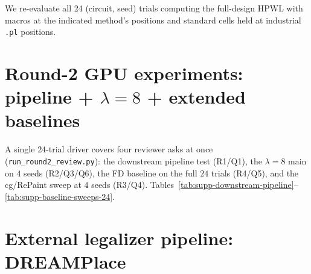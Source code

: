 \documentclass{article}
\begin{document}
We re-evaluate all 24 (circuit, seed) trials computing the full-design
HPWL with macros at the indicated method's positions and standard
cells held at industrial \texttt{.pl} positions.

\begin{table}[h]
\centering
\small

\caption{Full per-trial metrics; $\Delta\text{oa}$ is total overlap
area, $\Delta h_\text{macro}$ is macros-only HPWL,
$\Delta h_\text{full}$ is full-design HPWL with cells at \texttt{.pl}.
Median full-design $\Delta h$ is $+10.7\%$ (post-VSR) and $-1.6\%$
(VSR-intra-soft).  Adaptec3 inflates more sharply on the full design
($+73\%$ vs.\ $+18\%$ macros-only); other circuits track the
macros-only trend.}
\label{tab:supp-full-hpwl}
\end{table}

\section{Round-2 GPU experiments: pipeline + $\lambda{=}8$ + extended baselines}
\label{sec:supp-round2}

A single $24$-trial driver covers four reviewer asks at once
(\texttt{run\_round2\_review.py}):
the downstream pipeline test (R1/Q1), the $\lambda{=}8$ main on
$4$ seeds (R2/Q3/Q6), the FD baseline on the full $24$ trials (R4/Q5),
and the cg/RePaint sweep at $4$ seeds (R3/Q4).
Tables~\ref{tab:supp-downstream-pipeline}--\ref{tab:supp-baseline-sweeps-24}.

\begin{table}[h]
\centering
\small

\caption{Downstream pipeline test (R1/Q1).  raw $\to$
\texttt{cd-sched} vs.\ raw $\to$ VSR-post($\lambda{=}8$) $\to$
\texttt{cd-sched}, on $24$ trials.  Pre-conditioning with VSR cuts
$7.4$pp more violations and gives slightly lower full-design HPWL.}
\label{tab:supp-downstream-pipeline}
\end{table}

\begin{table}[h]
\centering
\small

\caption{$\lambda{=}8$ main result on the same $24$ trials as Table~1
(R2/Q3/Q6).  Residual violation count $v_\text{post}$ is reported per
circuit; $\lambda{=}8$ shifts macros-only HPWL strongly negative
without changing residual violation magnitude vs.\ $\lambda{=}2$.}
\label{tab:supp-lambda8-main}
\end{table}

\section{External legalizer pipeline: DREAMPlace}
\label{sec:supp-dreamplace}
\end{document}
